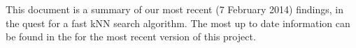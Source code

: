 
This document is a summary of our most recent (7 February 2014) findings, in the quest for a fast kNN search algorithm. The most up to date information can be found in the 
for the most recent version of this project.





